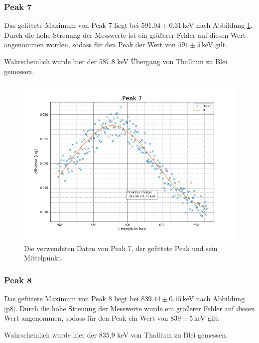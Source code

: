 \subsubsection{Peak 7}
Das gefittete Maximum von Peak 7 liegt bei $591.04\pm0.31\,$keV nach Abbildung \ref{p7}. Durch die hohe Streuung der Messwerte ist ein größerer Fehler auf diesen Wert angenommen worden, sodass für den Peak der Wert von $591\pm5\,$keV gilt.\par
Wahrscheinlich wurde hier der 587.8 keV \cite{Thallium} Übergang von Thallium zu Blei gemessen.

\begin{figure}[h]
	\centering
	\includegraphics[scale=0.7]{Bilder/Anhang/P7}
	\caption[Thorium Peak 7]{\small Die verwendeten Daten von Peak 7, der gefittete Peak und sein Mittelpunkt.}
	\label{p7}
\end{figure}

\subsubsection{Peak 8}
Das gefittete Maximum von Peak 8 liegt bei $839.44\pm0.15\,$keV nach Abbildung \ref{p8}. Durch die hohe Streuung der Messwerte wurde ein größerer Fehler auf diesen Wert angenommen, sodass für den Peak ein Wert von $839\pm5\,$keV gilt.\par
Wahrscheinlich wurde hier der 835.9 keV \cite{Thallium} von Thallium zu Blei gemessen.


